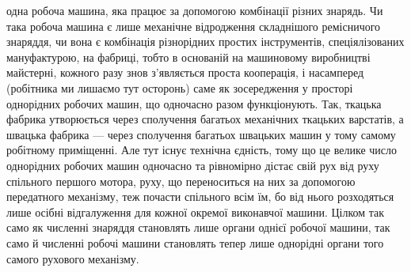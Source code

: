 \parcont{}  %
одна робоча машина, яка працює за допомогою комбінації різних
знарядь. Чи така робоча машина є лише механічне відродження
складнішого ремісничого знаряддя, чи вона є комбінація різнорідних
простих інструментів, спеціялізованих мануфактурою, на
фабриці, тобто в основаній на машиновому виробництві майстерні,
кожного разу знов з’являється проста кооперація, і насамперед
(робітника ми лишаємо тут осторонь) саме як зосередження у просторі
однорідних робочих машин, що одночасно разом функціонують.
Так, ткацька фабрика утворюється через сполучення
багатьох механічних ткацьких варстатів, а швацька фабрика —
через сполучення багатьох швацьких машин у тому самому робітному
приміщенні. Але тут існує технічна єдність, тому що це
велике число однорідних робочих машин одночасно та рівномірно
дістає свій рух від руху спільного першого мотора, руху, що
переноситься на них за допомогою передатного механізму, теж
почасти спільного всім їм, бо від нього розходяться лише осібні
відгалуження для кожної окремої виконавчої машини. Цілком
так само як численні знаряддя становлять лише органи однієї
робочої машини, так само й численні робочі машини становлять
тепер лише однорідні органи того самого рухового механізму.

